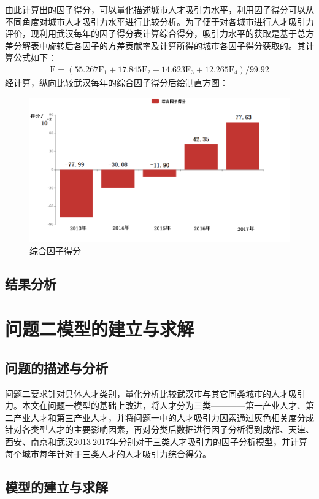 \documentclass{whutmod}
\begin{document}
	由此计算出的因子得分，可以量化描述城市人才吸引力水平，利用因子得分可以从不同角度对城市人才吸引力水平进行比较分析。为了便于对各城市进行人才吸引力评价，现利用武汉每年的因子得分表计算综合得分，吸引力水平的获取是基于总方差分解表中旋转后各因子的方差贡献率及计算所得的城市各因子得分获取的。其计算公式如下：
	\begin{gather}
	\mathrm { F } = \left( 55.267 \mathrm { F } _ { 1 } + 17.845 \mathrm { F } _ { 2 } + 14.623 \mathrm { F } _ { 3 } + 12.265 \mathrm { F } _ { 4 } \right) / 99.92
	\end{gather}
	经计算，纵向比较武汉每年的综合因子得分后绘制直方图：
		\begin{figure}[H]
		\centering
		\includegraphics[width=\textwidth]{figures/wuhan.png}
		\caption{综合因子得分}
	\end{figure} 
	\subsection{结果分析}
	
	
	\section{问题二模型的建立与求解}
	\subsection{问题的描述与分析}
	问题二要求针对具体人才类别，量化分析比较武汉市与其它同类城市的人才吸引力。本文在问题一模型的基础上改进，将人才分为三类————第一产业人才、第二产业人才和第三产业人才，并将问题一中的人才吸引力因素通过灰色相关度分成针对各类型人才的主要影响因素，再对分类后数据进行因子分析得到成都、天津、西安、南京和武汉$2013~2017$年分别对于三类人才吸引力的因子分析模型，并计算每个城市每年针对于三类人才的人才吸引力综合得分。 
	\subsection{模型的建立与求解}
\end{document}
